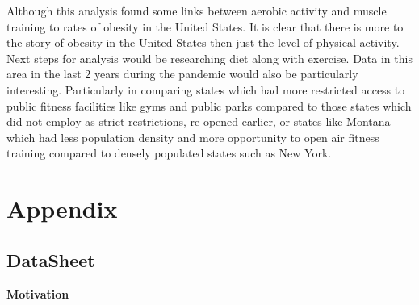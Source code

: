 \documentclass[
]{article}
\begin{document}
Although this analysis found some links between aerobic activity and muscle training to rates of obesity in the United States. It is clear that there is more to the story of obesity in the United States then just the level of physical activity. Next steps for analysis would be researching diet along with exercise. Data in this area in the last 2 years during the pandemic would also be particularly interesting. Particularly in comparing states which had more restricted access to public fitness facilities like gyms and public parks compared to those states which did not employ as strict restrictions, re-opened earlier, or states like Montana which had less population density and more opportunity to open air fitness training compared to densely populated states such as New York.

\newpage

\appendix

\hypertarget{appendix}{%
\section*{Appendix}\label{appendix}}

\hypertarget{datasheet}{%
\subsection*{DataSheet}\label{datasheet}}

\textbf{Motivation}
\end{document}
